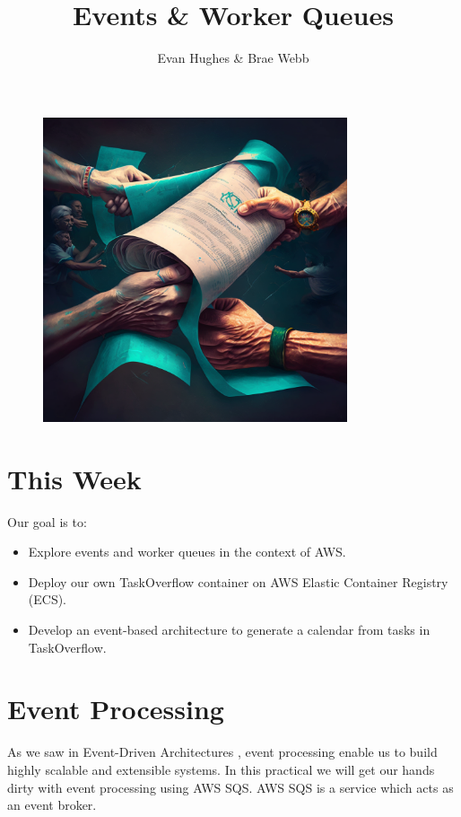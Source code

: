 \documentclass{csse4400}
\title{Events \& Worker Queues}
\author{Evan Hughes \& Brae Webb}
\date{\week[practical]{7}}
\begin{document}
\maketitle

\begin{figure}[ht]
    \centering
    \includegraphics[width=0.8\textwidth]{images/event-driven}
\end{figure}


\section{This Week}
Our goal is to:
\begin{itemize}
    \item Explore events and worker queues in the context of AWS.
    \item Deploy our own TaskOverflow container on AWS Elastic Container Registry (ECS).
    \item Develop an event-based architecture to generate a calendar from tasks in TaskOverflow.
\end{itemize}

\section{Event Processing}

As we saw in Event-Driven Architectures \cite{events-notes},
event processing enable us to build highly scalable and extensible systems.
In this practical we will get our hands dirty with event processing using AWS SQS.
AWS SQS is a service which acts as an event broker.
\end{document}

